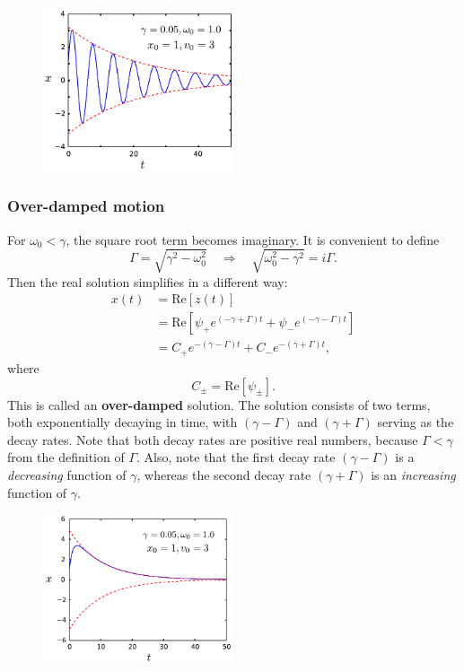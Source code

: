 \documentclass[10pt,a4paper]{article}
\begin{document}
\begin{figure}[h]
  \centering\includegraphics[width=0.5\textwidth]{underdamped}
\end{figure}
   
\subsubsection{Over-damped motion}\label{over-damped-motion}

For $\omega_0 < \gamma$, the square root term becomes imaginary. It is
convenient to define
\begin{equation}
\Gamma = \sqrt{\gamma^2 - \omega_0^2} \quad \Rightarrow \quad \sqrt{\omega_0^2 - \gamma^2} = i \Gamma.
\end{equation}
Then the real solution simplifies in a different way:
\begin{align}
  x(t) &= \mathrm{Re}\left[z(t)\right] \\&= \mathrm{Re}\left[\psi_+ e^{\left(-\gamma  + \Gamma\right)t} + \psi_- e^{\left(-\gamma - \Gamma\right)t} \right] \\ &= C_+ e^{-(\gamma - \Gamma) t} + C_- e^{-(\gamma + \Gamma) t},
\end{align}
where
\begin{equation}
C_\pm = \mathrm{Re}[\psi_\pm].
\end{equation}
This is called an \textbf{over-damped} solution. The solution consists
of two terms, both exponentially decaying in time, with
$(\gamma-\Gamma)$ and $(\gamma + \Gamma)$ serving as the decay
rates. Note that both decay rates are positive real numbers, because
$\Gamma < \gamma$ from the definition of $\Gamma$. Also, note that
the first decay rate $(\gamma - \Gamma)$ is a \emph{decreasing}
function of $\gamma$, whereas the second decay rate
$(\gamma + \Gamma)$ is an \emph{increasing} function of $\gamma$.

\begin{figure}[h]
  \centering\includegraphics[width=0.5\textwidth]{overdamped}
\end{figure}
\end{document}
